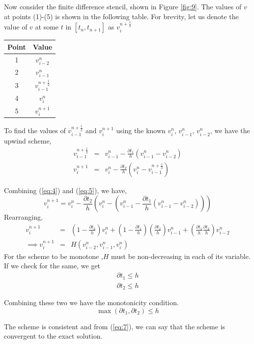 \documentclass[11pt]{report}
\begin{document}
\noindent
Now consider the finite difference stencil, shown in Figure \ref{fig:9}. The values of $v$ at points (1)-(5) is shown in the following table. For brevity, let us denote the value of $v$ at some $t$ in $[t_n, t_{n+1}] $ as $v_i^{n+\frac{1}{2}}$
\begin{center}
	\begin{tabular}{|c|c|}
		\hline
		Point & Value\\
		\hline
		1 & $v_{i-2}^n$ \\
		\hline
		2 & $v_{i-1}^n$ \\
		\hline
		3 & $v_{i-1}^{n+\frac{1}{2}}$ \\		
		\hline
		4 & $v_{i}^n$ \\
		\hline
		5 & $v_{i}^{n+1}$ \\				
		\hline
	\end{tabular}
\end{center}

\noindent
To find the values of $v_{i-1}^{n + \frac{1}{2}}$ and $v_i^{n+1}$ using the known $v_i^n$, $v_{i-1}^n$, $v_{i-2}^n$, we have the upwind scheme,
\begin{eqnarray}\label{eq:4}
	v_{i-1}^{n+\frac{1}{2}} &=& v_{i-1}^n - \frac{\partial t_1}{h} \left(v_{i-1}^n - v_{i-2}^n\right)\\\label{eq:5}
	v_i^{n+1} &=& v_i^n - \frac{\partial t_2}{h} \left(v_i^n - v_{i-1}^{n+\frac{1}{2}}\right)
\end{eqnarray} 

\noindent
Combining (\ref{eq:4}) and (\ref{eq:5}), we have,
\begin{equation}
	v_i^{n+1} = v_i^{n} - \frac{\partial t_2}{h} \left(v_i^n - \left(v_{i-1}^n - \frac{\partial t_1}{h} \left(v_{i-1}^n - v_{i-2}^n \right) \right) \right)
\end{equation}
\noindent
Rearranging,
\begin{eqnarray}
	v_i^{n+1} &=& \left(1-\frac{\partial t_2}{h}\right) v_i^n + \left(1-\frac{\partial t_1}{h}\right) \left(\frac{\partial t_2}{h}\right) v_{i-1}^n + \left(\frac{\partial t_1}{h}\frac{\partial t_2}{h}\right) v_{i-2}^n\\
	\implies v_i^{n+1} &=& H(v_{i-2}^n, v_{i-1}^n, v_{i}^n)
\end{eqnarray}
\noindent
For the scheme to be monotone ,$H$ must be non-decreasing in each of its variable. If we check for the same, we get
\begin{eqnarray} \nonumber
	\partial t_1 \le h \\\nonumber
	\partial t_2 \le h
\end{eqnarray}

\noindent
Combining these two we have the monotonicity condition.
\begin{equation}
	\max(\partial t_1, \partial t_2) \le h \label{eq:7}
\end{equation}

\noindent
The scheme is consistent and from (\ref{eq:7}), we can say that the scheme is convergent to the exact solution.


\nocite{*}


\end{document}

